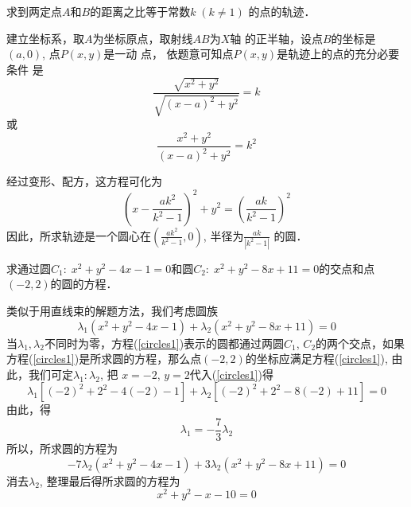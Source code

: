 \begin{example}
    求到两定点$A$和$B$的距离之比等于常数$k\; (k\ne 1)$
的点的轨迹．
\end{example}

\begin{figure}[htp]
    \centering
{}
    \caption{}
\end{figure}

\begin{solution}
    建立坐标系，取$A$为坐标原点，取射线$AB$为$X$轴
的正半轴，设点$B$的坐标是$(a,0)$, 点$P(x,y)$是一动
点，
依题意可知点$P(x,y)$是轨迹上的点的充分必要条件
是
\[\frac{\sqrt{x^2+y^2}}{\sqrt{(x-a)^2+y^2}}=k\]
或
\[\frac{{x^2+y^2}}{{(x-a)^2+y^2}}=k^2\]

经过变形、配方，这方程可化为
\[\left(x-\frac{ak^2}{k^2-1}\right)^2+y^2=\left(\frac{ak}{k^2-1}\right)^2\]
因此，所求轨迹是一个圆心在$\left(\frac{ak^2}{k^2-1},0\right)$,
半径为$\frac{ak}{|k^2-1|}$
的圆．
\end{solution}

\begin{example}
    求通过圆$C_1:\; x^2+y^2-4x-1=0$和圆$C_2:\; x^2+
y^2-8x+11=0$的交点和点$(-2,2)$的圆的方程．
\end{example}

\begin{solution}
类似于用直线束的解题方法，我们考虑圆族
\begin{equation}\label{circles1}
    \lambda_1(x^2+y^2-4x-1)+\lambda_2(x^2+y^2-8x+11)=0
\end{equation}
当$\lambda_1,\lambda_2$不同时为零，方程(\ref{circles1})表示的圆都通过两圆$C_1$, 
$C_2$的两个交点，如果方程(\ref{circles1})是所求圆的方程，那么点$(-2,2)$的坐标应满足方程(\ref{circles1}), 由此，我们可定$\lambda_1:\lambda_2$, 把
$x=-2$, $y=2$代入(\ref{circles1})得
\[\lambda_1[(-2)^2+2^2-4(-2)-1]+\lambda_2[(-2)^2+2^2-8(-2)+11]=0\]
由此，得
\[\lambda_1=-\frac{7}{3}\lambda_2\]
所以，所求圆的方程为
\[-7\lambda_2(x^2+y^2-4x-1)+3\lambda_2(x^2+y^2-8x+11)=0\]
消去$\lambda_2$, 整理最后得所求圆的方程为
\[x^2+y^2-x-10=0\]
\end{solution}

